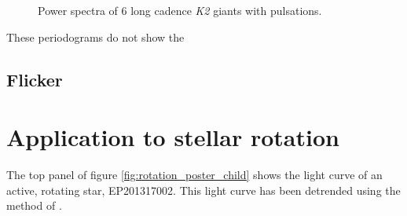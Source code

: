 \documentclass[useAMS, usenatbib]{aastex}
\begin{document}
\begin{figure}
\begin{center}
{        }
    \end{center}
    \caption{Power spectra of 6 long cadence {\it K2} giants with pulsations.
\label{fig:astero_examples}}
\end{figure}

These periodograms do not show the

\subsection{Flicker}

\section{Application to stellar rotation}
The top panel of figure \ref{fig:rotation_poster_child} shows the light curve
of an active, rotating star, EP201317002.
This light curve has been detrended using the method of
\citet{Vanderburg2014}.
\end{document}
